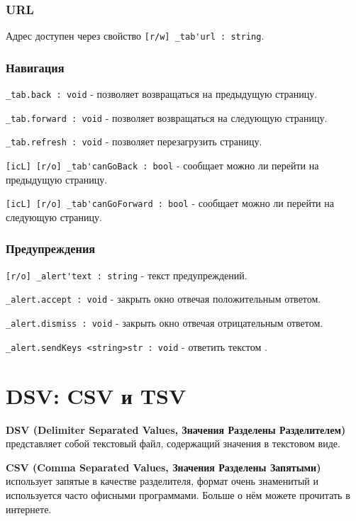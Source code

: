 \documentclass[a4paper, 14pt]{extarticle}
\newcommand{\ferror}[1]{\foreignlanguage{english}{\fontsize{11pt}{12pt}\tt{\sethlcolor{yellow}\hl{#1}}}}
\begin{document}
\subsubsection{URL}

Адрес доступен через свойство \lstinline|[r/w] _tab'url : string|.

\subsubsection{Навигация}

\lstinline|_tab.back : void| - позволяет возвращаться на предыдущую страницу.

\lstinline|_tab.forward : void| - позволяет возвращаться на следующую страницу.

\lstinline|_tab.refresh : void| -  позволяет перезагрузить страницу.

\lstinline|[icL] [r/o] _tab'canGoBack : bool| - сообщает можно ли перейти на предыдущую страницу.

\lstinline|[icL] [r/o] _tab'canGoForward : bool| - сообщает можно ли перейти на следующую страницу.


\subsubsection{Предупреждения}

\lstinline|[r/o] _alert'text : string| - текст предупреждений.

\lstinline|_alert.accept : void| - закрыть окно отвечая положительным ответом.

\lstinline|_alert.dismiss : void| - закрыть окно отвечая отрицательным ответом.

\lstinline|_alert.sendKeys <string>str : void| - ответить текстом .


\section{DSV: CSV и TSV}

{\bf DSV (Delimiter Separated Values, Значения Разделены Разделителем)} представляет собой текстовый файл, содержащий значения в текстовом виде.

{\bf CSV (Comma Separated Values, Значения Разделены Запятыми)} использует запятые в качестве разделителя, формат очень знаменитый и используется часто офисными программами. Больше о нём можете прочитать в интернете.
\end{document}
